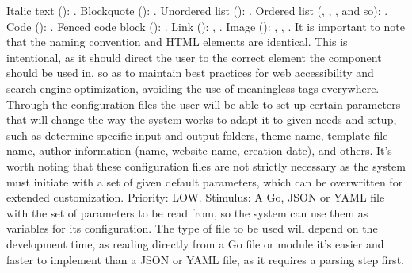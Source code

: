 \markdownRendererUlItem Italic text (): .\markdownRendererUlItemEnd 
\markdownRendererUlItem Blockquote (\markdownRendererCodeSpan{>}): .\markdownRendererUlItemEnd 
\markdownRendererUlItem Unordered list (\markdownRendererCodeSpan{-}): .\markdownRendererUlItemEnd 
\markdownRendererUlItem Ordered list (, , , and so): .\markdownRendererUlItemEnd 
\markdownRendererUlItem Code (): .\markdownRendererUlItemEnd 
\markdownRendererUlItem Fenced code block (): .\markdownRendererUlItemEnd 
\markdownRendererUlItem Link (): , .\markdownRendererUlItemEnd 
\markdownRendererUlItem Image (): , , .\markdownRendererUlItemEnd 
\markdownRendererUlEndTight \markdownRendererInterblockSeparator
{}It is important to note that the naming convention and HTML elements are identical. This is intentional, as it should direct the user to the correct element the component should be used in, so as to maintain best practices for web accessibility and search engine optimization, avoiding the use of meaningless  tags everywhere.\markdownRendererInterblockSeparator
{}\markdownRendererInterblockSeparator
{}\markdownRendererInterblockSeparator
{}Through the configuration files the user will be able to set up certain parameters that will change the way the system works to adapt it to given needs and setup, such as determine specific input and output folders, theme name, template file name, author information (name, website name, creation date), and others. It's worth noting that these configuration files are not strictly necessary as the system must initiate with a set of given default parameters, which can be overwritten for extended customization. Priority: LOW.\markdownRendererInterblockSeparator
{}\markdownRendererInterblockSeparator
{}Stimulus: A Go, JSON or YAML file with the set of parameters to be read from, so the system can use them as variables for its configuration. The type of file to be used will depend on the development time, as reading directly from a Go file or module it's easier and faster to implement than a JSON or YAML file, as it requires a parsing step first.\markdownRendererInterblockSeparator
